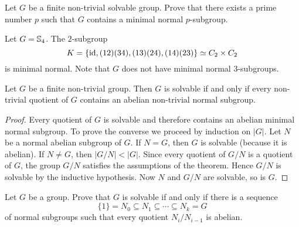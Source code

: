 \begin{exercise}
    Let $G$ be a finite non-trivial solvable group. Prove that 
    there exists a prime number $p$ such that $G$ 
    contains a minimal normal $p$-subgroup. 
\end{exercise}

\begin{example}
	Let $G=\mathbb{S}_4$. The $2$-subgroup 
	\[
	K=\{\operatorname{id},(12)(34),(13)(24),(14)(23)\}\simeq
	C_2\times C_2
	\]
	is minimal normal. Note that $G$ does not have minimal normal $3$-subgroups. 
\end{example}

\begin{theorem}
Let $G$ be a finite non-trivial group. Then $G$ is solvable if and only if 
every non-trivial quotient of $G$ contains an abelian non-trivial normal subgroup. 
\end{theorem}

\begin{proof}
Every quotient of $G$ is solvable and therefore contains an abelian 
minimal normal subgroup. To prove the converse we proceed by induction on $|G|$. Let 
$N$ be a normal abelian subgroup of $G$. If $N=G$, then $G$ is solvable (because it is abelian). If 
$N\ne G$, then $|G/N|<|G|$. Since every quotient of $G/N$ is a quotient of $G$, the group 
$G/N$ satisfies the assumptions of the theorem. Hence $G/N$ is solvable by the inductive hypothesis. 
Now $N$ and $G/N$ are solvable, so is $G$. 
\end{proof}


\begin{exercise}
	\label{exercise:solvable}
	Let $G$ be a group. Prove that $G$ is solvable if and only if there is a sequence
	\[
		\{1\}=N_0\subseteq N_1\subseteq\cdots\subseteq N_k=G
	\]
        of normal subgroups such that every quotient 
	$N_i/N_{i-1}$ is abelian.
\end{exercise}


